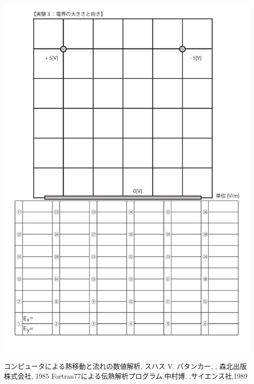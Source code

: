 \documentclass[uplatex,a4paper,11pt,oneside,openany]{jsbook}
\begin{document}
\includegraphics[scale=0.8]{./figure/E10.pdf}

\newpage



\newpage



\newpage



%
  \begin{thebibliography}{99}
     コンピュータによる熱移動と流れの数値解析, スハス V. パタンカー, , 森北出版株式会社, 1985
     Fortran77による伝熱解析プログラム,中村博, ,サイエンス社,1989
  \end{thebibliography}

%
\end{document}
